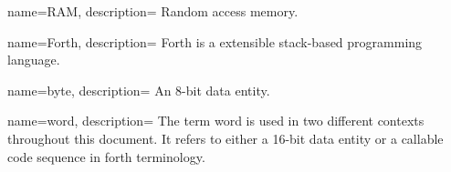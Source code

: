 
 {
    name={RAM},
    description={
      Random access memory.
      \nopostdesc
    }
}

 {
    name={Forth},
    description={
      Forth is a extensible stack-based programming language.
      \nopostdesc
    }
}
 
 {
    name={byte},
    description={
      An 8-bit data entity.
      \nopostdesc
    }
}

 {
    name={word},
    description={
      The term word is used in two different contexts throughout
      this document. It refers to either a 16-bit data entity or
      a callable code sequence in \Gls{forth} terminology.
      \nopostdesc
    }
}


